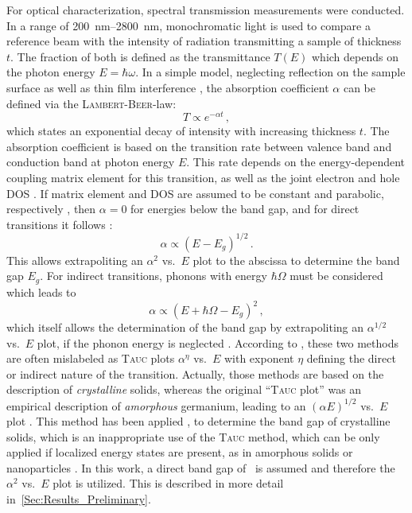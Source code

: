 For optical characterization, spectral transmission measurements were conducted.
In a range of \qtyrange{200}{2800}{\nm}, monochromatic light is used to compare a reference beam with the intensity of radiation transmitting a sample of thickness $t$.
The fraction of both is defined as the transmittance $T(E)$ which depends on the photon energy $E=\hbar\omega$.
In a simple model, neglecting reflection on the sample surface as well as thin film interference
    \cite{manifacier1977},
the absorption coefficient $\alpha$ can be defined via the \textsc{Lambert}-\textsc{Beer}-law:
\begin{equation}
    T\propto e^{-\alpha t}\,,
\end{equation}
which states an exponential decay of intensity with increasing thickness $t$.
The absorption coefficient is based on the transition rate between valence band and conduction band at photon energy $E$.
This rate depends on the energy-dependent coupling matrix element for this transition, as well as the joint electron and hole \gls{DOS}
    \cite{zanatta2019}.
If matrix element and \gls{DOS} are assumed to be constant and parabolic, respectively
    \cite{tauc2005},
then $\alpha=0$ for energies below the band gap, and for direct transitions it follows \cite{zanatta2019}:
\begin{equation}
    \alpha\propto (E-E_g)^{1/2}\,.
\end{equation}
This allows extrapoliting an $\alpha^2$ vs.\ $E$ plot to the abscissa to determine the band gap $E_g$.
For indirect transitions, phonons with energy $\hbar\Omega$ must be considered which leads to
\begin{equation}
    \alpha\propto (E+\hbar\Omega-E_g)^2\,,
\end{equation}
which itself allows the determination of the band gap by extrapoliting an $\alpha^{1/2}$ vs.\ $E$ plot, if the phonon energy is neglected
    \cite{zanatta2019}.
According to \textcite{zanatta2019}, these two methods are often mislabeled as \textsc{Tauc} plots $\alpha^\eta$ vs.\ $E$ with exponent $\eta$ defining the direct or indirect nature of the transition.
Actually, those methods are based on the description of \emph{crystalline} solids, whereas the original \enquote{\textsc{Tauc} plot} was an empirical description of \emph{amorphous} germanium, leading to an $(\alpha E)^{1/2}$ vs.\ $E$ plot
    \cite{tauc2005}.
This method has been applied
    \cite{cheng1996,al-kuhaili2007,singh2019,farrell2015},
to determine the band gap of crystalline solids, which is an inappropriate use of the \textsc{Tauc} method, which can be only applied if localized energy states are present, as in amorphous solids or nanoparticles
    \cite{dolgonos2016}.
In this work, a direct band gap of \cro\ is assumed and therefore the $\alpha^2$ vs.\ $E$ plot is utilized.
This is described in more detail in~\ref{Sec:Results_Preliminary}.

